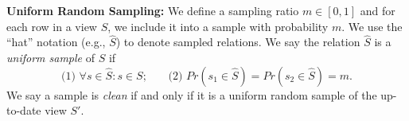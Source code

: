 \noindent \textbf{Uniform Random Sampling:}
We define a sampling ratio $m\in [0,1]$ and for each row in a view $S$, we include it into a sample with probability $m$.
We use the ``hat'' notation (e.g., $\widehat{S}$) to denote sampled relations.
We say the relation $\widehat{S}$ is a \emph{uniform sample} of $S$ if
\[\text{(1) } \forall s \in \widehat{S} : s \in S\text{;~~~~~ (2) }Pr(s_1 \in \widehat{S}) =  Pr(s_2 \in \widehat{S}) = m.\]
We say a sample is \emph{clean} if and only if it is a uniform random sample of the up-to-date view $S'$. 

